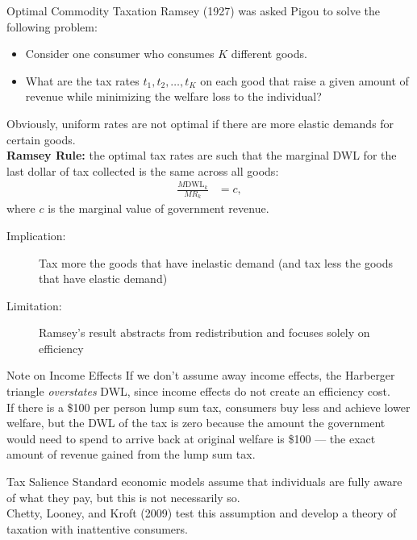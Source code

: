 \documentclass[8pt]{extarticle}
\begin{document}
  \begin{problem}{Optimal Commodity Taxation}
    Ramsey (1927) was asked Pigou to solve the following problem:
    \begin{itemize}
      \item Consider one consumer who consumes $K$ different goods.
      \item What are the tax rates $t_1,t_2,\dots,t_K$ on each good that raise a given amount of revenue while minimizing the welfare loss to the individual?
    \end{itemize}
    Obviously, uniform rates are not optimal if there are more elastic demands for certain goods.\\

    \textbf{Ramsey Rule:} the optimal tax rates are such that the marginal DWL for the last dollar of tax collected is the same across all goods:
    \begin{align*}
      \frac{M\text{DWL}_k}{MR_k} &= c, \tag*{for all $k = 1,2,\dots,K$}
    \end{align*}
    where $c$ is the marginal value of government revenue.
    \begin{description}
      \item[Implication:] Tax more the goods that have inelastic demand (and tax less the goods that have elastic demand)
      \item[Limitation:] Ramsey's result abstracts from redistribution and focuses solely on efficiency
    \end{description}
  \end{problem}
  \begin{problem}{Note on Income Effects}
    If we don't assume away income effects, the Harberger triangle \textit{overstates} DWL, since income effects do not create an efficiency cost.\\

    If there is a \$100 per person lump sum tax, consumers buy less and achieve lower welfare, but the DWL of the tax is zero because the amount the government would need to spend to arrive back at original welfare is \$100 --- the exact amount of revenue gained from the lump sum tax.
  \end{problem}
  \begin{problem}{Tax Salience}
    Standard economic models assume that individuals are fully aware of what they pay, but this is not necessarily so.\\

    Chetty, Looney, and Kroft (2009) test this assumption and develop a theory of taxation with inattentive consumers.
  \end{problem}
\end{document}
